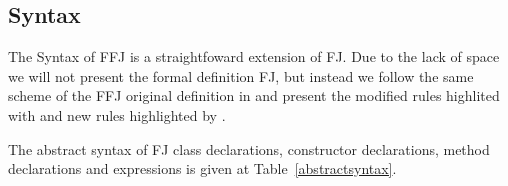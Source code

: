
\subsection{Syntax}
The Syntax of \ac{FFJ} is a straightfoward extension of \ac{FJ}. Due to the lack
of space we will not present the formal definition \ac{FJ}, but instead we follow
the same scheme of the \ac{FFJ} original definition in \cite{apel_feature_2008} and present
the modified rules highlited with  and new rules highlighted by
.


The abstract syntax of FJ class declarations, constructor declarations, method
declarations and expressions is given at Table~\ref{abstractsyntax}.

